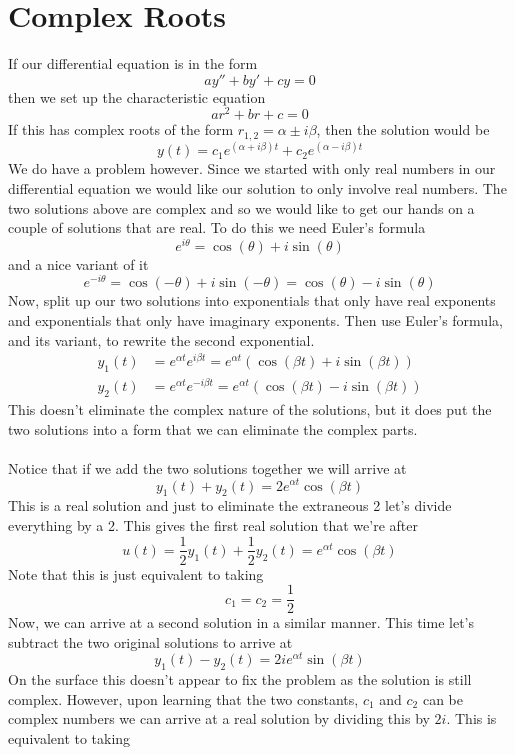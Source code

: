 \documentclass[10pt,reqno]{book}
\theoremstyle{definition}
\begin{document}
	\section{Complex Roots}

	If our differential equation is in the form
	\[ ay'' + by' + cy = 0 \]
	then we set up the characteristic equation
	\[ ar^2 + br + c = 0 \]
	If this has complex roots of the form $ r_{1,2} = \alpha \pm i \beta $, then the solution would be
	\[ y(t) = c_1 e^{(\alpha + i \beta)t} + c_2 e^{(\alpha - i \beta)t} \]
	We do have a problem however.  Since we started with only real numbers in our differential equation we would like our solution to only involve real numbers.  The two solutions above are complex and so we would like to get our hands on a couple of solutions that are real. To do this we need Euler's formula
	\[ e^{i\theta} = \cos(\theta) + i\sin(\theta) \]
	and a nice variant of it
	\[ e^{-i\theta} = \cos(-\theta) + i\sin(-\theta) = \cos(\theta) - i\sin(\theta) \]
	Now, split up our two solutions into exponentials that only have real exponents and exponentials that only have imaginary exponents. Then use Euler’s formula, and its variant, to rewrite the second exponential.
	\begin{align*}
		y_1(t) &= e^{\alpha t} e^{i \beta t} = e^{\alpha t}(\cos(\beta t) + i\sin(\beta t))\\
		y_2(t) &= e^{\alpha t} e^{-i \beta t} = e^{\alpha t}(\cos(\beta t) - i\sin(\beta t))
	\end{align*}
	This doesn’t eliminate the complex nature of the solutions, but it does put the two solutions into a form that we can eliminate the complex parts.\\ \\
	Notice that if we add the two solutions together we will arrive at
	\[ y_1(t) + y_2(t) = 2e^{\alpha t} \cos(\beta t) \]
	This is a real solution and just to eliminate the extraneous 2 let’s divide everything by a 2. This gives the first real solution that we’re after
	\[ u(t) = \frac{1}{2}y_1(t) + \frac{1}{2}y_2(t) = e^{\alpha t} \cos(\beta t) \]
	Note that this is just equivalent to taking
	\[ c_1 = c_2 = \frac{1}{2} \]
	Now, we can arrive at a second solution in a similar manner.  This time let’s subtract the two original solutions to arrive at
	\[ y_1(t) - y_2(t) = 2i e^{\alpha t} \sin(\beta t) \]
	On the surface this doesn't appear to fix the problem as the solution is still complex.  However, upon learning that the two constants, $ c_1 $ and $ c_2 $ can be complex numbers we can arrive at a real solution by dividing this by $ 2i $.  This is equivalent to taking
\end{document}
